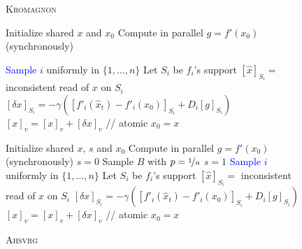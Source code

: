 \documentclass[twoside, 11pt]{article}
\newcommand{\KROMAGNON}{\textsc{Kromagnon}}
\newcommand{\AHSVRG}{\textsc{Ahsvrg}}
\renewcommand{\algorithmicloop}{\textbf{keep doing in parallel}} %
\renewcommand{\algorithmicendloop}{\algorithmicend\ \textbf{parallel loop}}
\begin{document}
\begin{figure}[ttt!]
\centering
 \renewcommand{\algorithmicloop}{\textbf{for $i=1..m$ do in parallel (asynchronously)}} %
 \renewcommand{\algorithmicendloop}{\algorithmicend\ \textbf{parallel loop}}
 \begin{minipage}[t]{0.62\textwidth}
    \begin{algorithm}[H]
      \caption{\KROMAGNON~\citep{mania}}
      \label{alg:kromagnon}
      \begin{algorithmic}[1]
	    \STATE Initialize shared $x$ and $x_0$
     	    \STATE Compute in parallel $g = f'(x_0)$ (synchronously)

	    \LOOP
	      \STATE \textcolor{blue}{Sample $i$} uniformly in $\{1,...,n\}$
  	      \STATE Let $S_i$ be $f_i$'s support
 	      \STATE $[\hat x]_{S_i} = $ inconsistent read of $x$ on $S_i$
	      \STATE $[\delta x]_{S_i} = - \gamma ([f'_i(\hat x_t) - f'_i(x_0)]_{S_i} + D_i [g]_{S_i})$
	        \STATE $[x]_v = [x]_v + [\delta x]_v$  \hfill // atomic
	     \ENDFOR
	   \ENDLOOP
	   \STATE $x_0 = x$
   	    \ENDWHILE
      \end{algorithmic}
    \end{algorithm}
 \end{minipage}
 \hfill
  \begin{minipage}[t]{0.62\textwidth}
  	  \renewcommand{\algorithmicloop}{\textbf{while $s=0$ do in parallel (asynchronously)}} %
  	  \renewcommand{\algorithmicendloop}{\algorithmicend\ \textbf{parallel loop}}
  	\begin{algorithm}[H]
  		\caption{\AHSVRG}
  		\label{alg:ahsvrg}
  		\begin{algorithmic}[1]
  			\STATE Initialize shared $x$, $s$ and $x_0$
	  			\STATE Compute in parallel $g = f'(x_0)$ (synchronously)
	  			\STATE $s = 0$
	  			\LOOP
		  			\STATE Sample $B$ with $p = \nicefrac{1}{n}$
			  			\STATE $s = 1$
		  			\ELSE
			  			\STATE \textcolor{blue}{Sample $i$} uniformly in $\{1,...,n\}$
			  			\STATE Let $S_i$ be $f_i$'s support
			  			\STATE $[\hat x]_{S_i} = $ inconsistent read of $x$ on $S_i$
			  			\STATE $[\delta x]_{S_i} = - \gamma ([f'_i(\hat x_t) - f'_i(x_0)]_{S_i} + D_i [g]_{S_i})$
				  			\STATE $[x]_v = [x]_v + [\delta x]_v$  \hfill // atomic
			  			\ENDFOR
		  			\ENDIF
	  			\ENDLOOP
	  			\STATE $x_0 = x$
  			\ENDWHILE
  		\end{algorithmic}
  	\end{algorithm}
  \end{minipage}
\end{figure}
\end{document}
